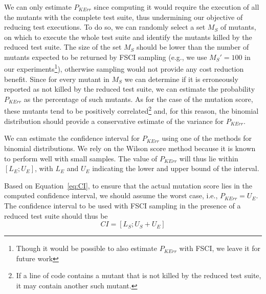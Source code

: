  {We can only estimate  $P_{\mathit{KErr}}$ since computing it would require the execution of all the mutants with the complete test suite, thus undermining our objective of reducing test executions. 
To do so, we can randomly select a set $M_S$ of mutants, on which to execute the whole test suite and identify the mutants killed by the reduced test suite. %
The size of the set $M_S$ should be lower than the number of mutants expected to be returned by FSCI sampling (e.g., we use $M_S'=100$ in our experiments\footnote{Though it would be possible to also estimate $P_{\mathit{KErr}}$ with FSCI, we leave it for future work}), otherwise sampling would not provide any cost reduction benefit.
Since for every mutant in $M_S$ we can determine if it is erroneously reported as not killed by the reduced test suite,
we can 
estimate the probability $P_{\mathit{KErr}}$ as the percentage of such mutants.
As for the case of the mutation score, these mutants tend to be positively  correlated\footnote{If a line of code contains a mutant that is not killed by the reduced test suite, it may contain another such mutant.} and, for this reason, the binomial distribution should provide a conservative estimate of the variance for $P_{\mathit{KErr}}$.} 

 {We can estimate the confidence interval for $P_{\mathit{KErr}}$ using one of the methods for binomial distributions.
We rely on the Wilson score method because it is known to perform well with small samples. 
The value of $P_{\mathit{KErr}}$ will thus lie within $[\mathit{L}_{E};\mathit{U}_{E}]$,  with $\mathit{L}_{E}$ and $\mathit{U}_{E}$ indicating the lower and upper bound of the interval.}

 {Based on Equation~\ref{eq:CI}, to ensure that the actual mutation score lies in the computed confidence interval, we should assume the worst case, i.e., $P_{\mathit{KErr}}=\mathit{U}_{E}$.
The confidence interval to be used with FSCI sampling in the presence of a reduced test suite should thus be }
\begin{equation}
\label{eq:CI:FSCI}
\mathit{CI}=[\mathit{L}_{S};\mathit{U}_{S}+\mathit{U}_{E}]
\end{equation}

